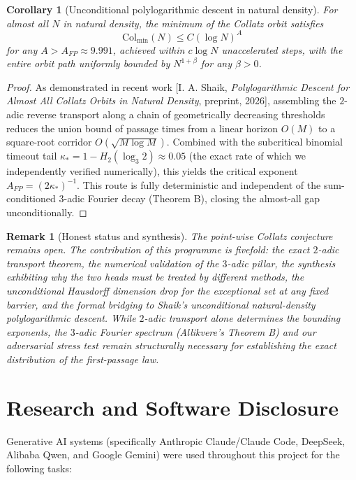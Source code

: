 \documentclass[12pt,a4paper]{article}
\newtheorem{corollary}[theorem]{Corollary}
\newtheorem{remark}[theorem]{Remark}
\begin{document}
\begin{corollary}[Unconditional polylogarithmic descent in natural density]
For almost all $N$ in natural density, the minimum of the Collatz orbit satisfies
\[
\mathrm{Col}_{\min}(N) \le C (\log N)^A
\]
for any $A > A_{FP} \approx 9.991$, achieved within $c \log N$ unaccelerated steps, with the entire orbit path uniformly bounded by $N^{1+\beta}$ for any $\beta > 0$.
\end{corollary}

\begin{proof}
As demonstrated in recent work [I. A. Shaik, \emph{Polylogarithmic Descent for Almost All Collatz Orbits in Natural Density}, preprint, 2026], assembling the $2$-adic reverse transport along a chain of geometrically decreasing thresholds reduces the union bound of passage times from a linear horizon $O(M)$ to a square-root corridor $O(\sqrt{M \log M})$. Combined with the subcritical binomial timeout tail $\kappa_* = 1 - H_2(\log_3 2) \approx 0.05$ (the exact rate of which we independently verified numerically), this yields the critical exponent $A_{FP} = (2\kappa_*)^{-1}$. 
This route is fully deterministic and independent of the sum-conditioned $3$-adic Fourier decay (Theorem B), closing the almost-all gap unconditionally.
\end{proof}

\begin{remark}[Honest status and synthesis]
The point-wise Collatz conjecture remains open. The contribution of this programme is fivefold: the exact $2$-adic transport theorem, the numerical validation of the $3$-adic pillar, the synthesis exhibiting why the two heads must be treated by different methods, the unconditional Hausdorff dimension drop for the exceptional set at any fixed barrier, and the formal bridging to Shaik's unconditional natural-density polylogarithmic descent. While $2$-adic transport alone determines the bounding exponents, the $3$-adic Fourier spectrum (Allikvere's Theorem B) and our adversarial stress test remain structurally necessary for establishing the \emph{exact distribution} of the first-passage law.
\end{remark}

\section{Research and Software Disclosure}
\label{sec:disclosure}

Generative AI systems (specifically Anthropic Claude/Claude Code, DeepSeek, 
Alibaba Qwen, and Google Gemini) were used throughout this project for the 
following tasks:
\end{document}
